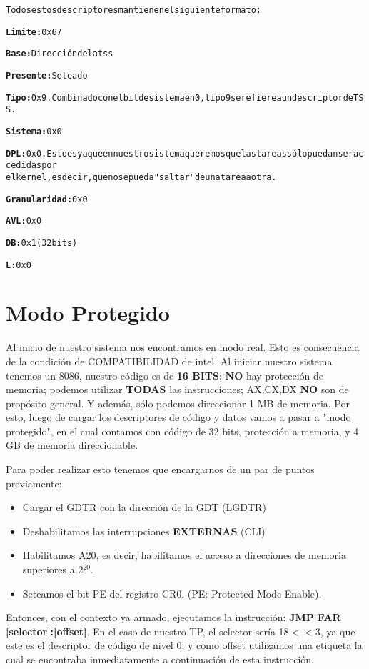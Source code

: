 {\begin{alltt}
\normalfont
		       Todos estos descriptores mantienen el siguiente formato:
		       
         \textbf{Limite:} 0x67
			   
         \textbf{Base:} Dirección de la tss
                     
         \textbf{Presente:} Seteado
                     
         \textbf{Tipo:} 0x9. Combinado con el bit de sistema en 0, tipo 9 se refiere a un descriptor de TSS.
                
         \textbf{Sistema:} 0x0
                     
         \textbf{DPL:} 0x0. Esto es ya que en nuestro sistema queremos que las tareas sólo puedan ser accedidas por
         el kernel, es decir, que no se pueda "saltar" de una tarea a otra.
			 	
         \textbf{Granularidad:} 0x0
                     
         \textbf{AVL:} 0x0
                     
         \textbf{DB:} 0x1 (32 bits)
                     
         \textbf{L:} 0x0
\end{alltt}
}

\section{Modo Protegido}
\par{Al inicio de nuestro sistema nos encontramos en modo real. Esto es consecuencia de la condición de COMPATIBILIDAD de intel. Al iniciar nuestro sistema tenemos un 8086, nuestro código es de \textbf{16 BITS}; \textbf{NO} hay protección de memoria; podemos utilizar \textbf{TODAS} las instrucciones; AX,CX,DX \textbf{NO} son de propósito general. Y además, sólo podemos direccionar 1 MB de memoria. Por esto, luego de cargar los descriptores de código y datos vamos a pasar a "modo protegido", en el cual contamos con código de 32 bits, protección a memoria, y 4 GB de memoria direccionable.
}
\par{
Para poder realizar esto tenemos que encargarnos de un par de puntos previamente:
\begin{itemize}
\item Cargar el GDTR con la dirección de la GDT (LGDTR)
\item Deshabilitamos las interrupciones \textbf{EXTERNAS} (CLI)
\item Habilitamos A20, es decir, habilitamos el acceso a direcciones de memoria superiores a 2$^{20}$.
\item Seteamos el bit PE del registro CR0. (PE: Protected Mode Enable).
\end{itemize}
Entonces, con el contexto ya armado, ejecutamos la instrucción: \textbf{JMP FAR [selector]:[offset]}. En el caso de nuestro TP, el selector sería 18$<<$3, ya que este es el descriptor de código de nivel 0; y como offset utilizamos una etiqueta la cual se encontraba inmediatamente a continuación de esta instrucción.
}

\clearpage